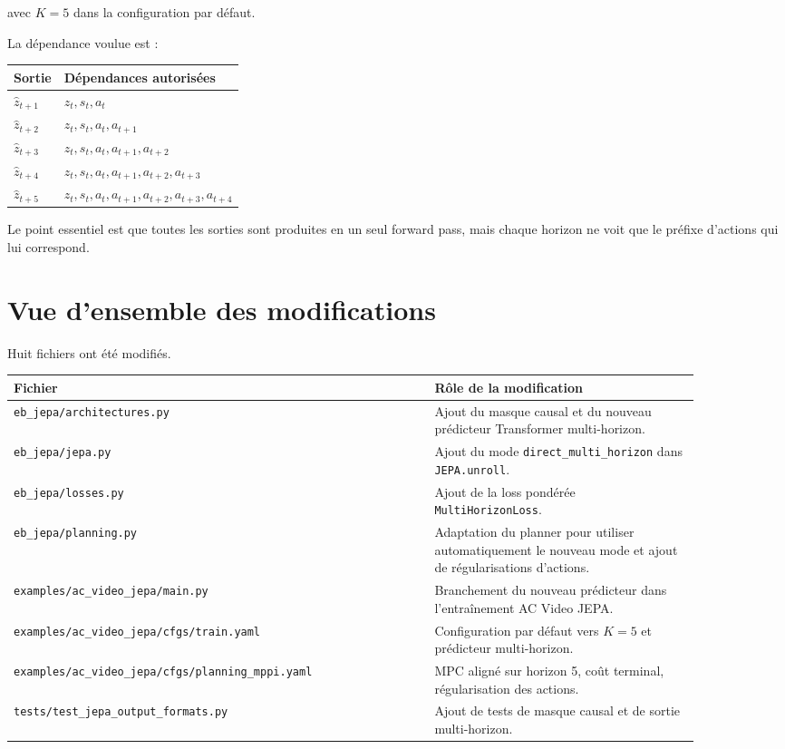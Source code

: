 \documentclass[11pt,a4paper]{article}
\newcommand{\filepath}[1]{\texttt{#1}}
\newcommand{\code}[1]{\texttt{#1}}
\begin{document}
avec \(K=5\) dans la configuration par défaut.

La dépendance voulue est :

\begin{center}
\begin{tabular}{ll}
\toprule
Sortie & Dépendances autorisées \\
\midrule
\(\hat z_{t+1}\) & \(z_t, s_t, a_t\) \\
\(\hat z_{t+2}\) & \(z_t, s_t, a_t, a_{t+1}\) \\
\(\hat z_{t+3}\) & \(z_t, s_t, a_t, a_{t+1}, a_{t+2}\) \\
\(\hat z_{t+4}\) & \(z_t, s_t, a_t, a_{t+1}, a_{t+2}, a_{t+3}\) \\
\(\hat z_{t+5}\) & \(z_t, s_t, a_t, a_{t+1}, a_{t+2}, a_{t+3}, a_{t+4}\) \\
\bottomrule
\end{tabular}
\end{center}

Le point essentiel est que toutes les sorties sont produites en un seul forward pass,
mais chaque horizon ne voit que le préfixe d'actions qui lui correspond.

\section{Vue d'ensemble des modifications}

Huit fichiers ont été modifiés.

\begin{center}
\begin{tabular}{>{\small\raggedright\arraybackslash}p{0.54\linewidth}p{0.34\linewidth}}
\toprule
Fichier & Rôle de la modification \\
\midrule
\filepath{eb\_jepa/architectures.py} & Ajout du masque causal et du nouveau prédicteur Transformer multi-horizon. \\
\filepath{eb\_jepa/jepa.py} & Ajout du mode \code{direct\_multi\_horizon} dans \code{JEPA.unroll}. \\
\filepath{eb\_jepa/losses.py} & Ajout de la loss pondérée \code{MultiHorizonLoss}. \\
\filepath{eb\_jepa/planning.py} & Adaptation du planner pour utiliser automatiquement le nouveau mode et ajout de régularisations d'actions. \\
\filepath{examples/ac\_video\_jepa/main.py} & Branchement du nouveau prédicteur dans l'entraînement AC Video JEPA. \\
\filepath{examples/ac\_video\_jepa/cfgs/train.yaml} & Configuration par défaut vers \(K=5\) et prédicteur multi-horizon. \\
\filepath{examples/ac\_video\_jepa/cfgs/planning\_mppi.yaml} & MPC aligné sur horizon 5, coût terminal, régularisation des actions. \\
\filepath{tests/test\_jepa\_output\_formats.py} & Ajout de tests de masque causal et de sortie multi-horizon. \\
\bottomrule
\end{tabular}
\end{center}
\end{document}
